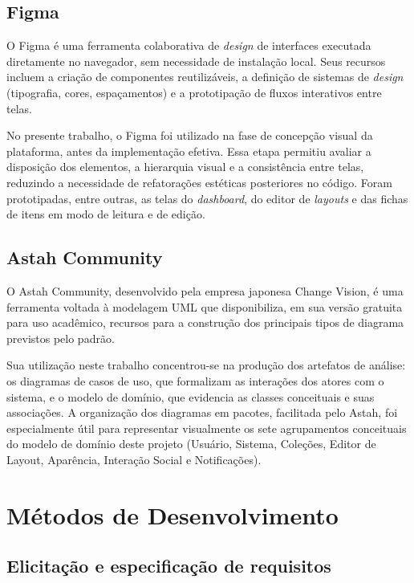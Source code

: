 \subsection{Figma}

O Figma é uma ferramenta colaborativa de \textit{design} de interfaces executada diretamente no navegador, sem necessidade de instalação local. Seus recursos incluem a criação de componentes reutilizáveis, a definição de sistemas de \textit{design} (tipografia, cores, espaçamentos) e a prototipação de fluxos interativos entre telas.

No presente trabalho, o Figma foi utilizado na fase de concepção visual da plataforma, antes da implementação efetiva. Essa etapa permitiu avaliar a disposição dos elementos, a hierarquia visual e a consistência entre telas, reduzindo a necessidade de refatorações estéticas posteriores no código. Foram prototipadas, entre outras, as telas do \textit{dashboard}, do editor de \textit{layouts} e das fichas de itens em modo de leitura e de edição.

\subsection{Astah Community}

O Astah Community, desenvolvido pela empresa japonesa Change Vision, é uma ferramenta voltada à modelagem UML que disponibiliza, em sua versão gratuita para uso acadêmico, recursos para a construção dos principais tipos de diagrama previstos pelo padrão.

Sua utilização neste trabalho concentrou-se na produção dos artefatos de análise: os diagramas de casos de uso, que formalizam as interações dos atores com o sistema, e o modelo de domínio, que evidencia as classes conceituais e suas associações. A organização dos diagramas em pacotes, facilitada pelo Astah, foi especialmente útil para representar visualmente os sete agrupamentos conceituais do modelo de domínio deste projeto (Usuário, Sistema, Coleções, Editor de Layout, Aparência, Interação Social e Notificações).

\section{Métodos de Desenvolvimento}

\subsection{Elicitação e especificação de requisitos}


